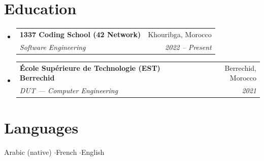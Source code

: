 \documentclass[letterpaper,10.5pt]{article}
\makeatletter
\newcommand{\entry}[4]{%
  \item\begin{tabular*}{\linewidth}{l@{\extracolsep{\fill}}r}
    \textbf{#1} & #2 \\ \textit{\small #3} & \textit{\small #4}\\
  \end{tabular*}\vspace{-6pt}}
\newenvironment{entries}{\begin{itemize}[leftmargin=0.12in,label={}]}{\end{itemize}}
\makeatother
\begin{document}
\section{Education}
\begin{entries}
  \entry{1337 Coding School (42 Network)}{Khouribga, Morocco}{Software Engineering}{2022 -- Present}
  \entry{\'Ecole Supérieure de Technologie (EST) Berrechid}{Berrechid, Morocco}{DUT --- Computer Engineering}{2021}
\end{entries}

\section{Languages}
\small{Arabic (native) \quad$\cdot$\quad French \quad$\cdot$\quad English}
\end{document}
